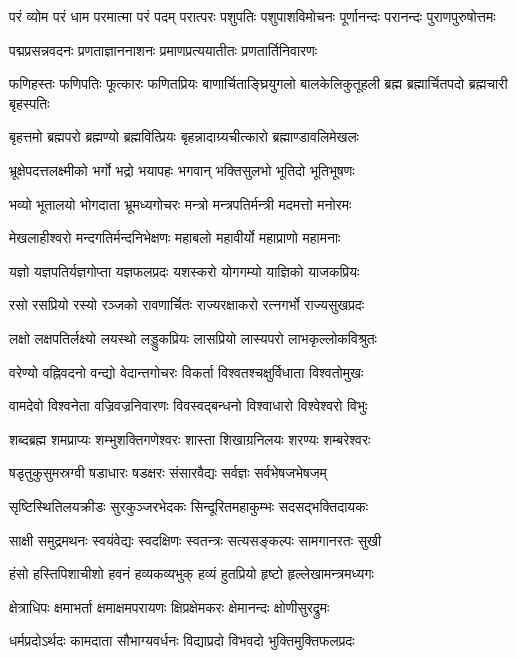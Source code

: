 \threelineshloka
{परं व्योम परं धाम परमात्मा परं पदम्}
{परात्परः पशुपतिः पशुपाशविमोचनः}
{पूर्णानन्दः परानन्दः पुराणपुरुषोत्तमः}

\twolineshloka
{पद्मप्रसन्नवदनः प्रणताज्ञाननाशनः}
{प्रमाणप्रत्ययातीतः प्रणतार्तिनिवारणः}

\threelineshloka
{फणिहस्तः फणिपतिः फूत्कारः फणितप्रियः}
{बाणार्चिताङ्घ्रियुगलो बालकेलिकुतूहली}
{ब्रह्म ब्रह्मार्चितपदो ब्रह्मचारी बृहस्पतिः}

\twolineshloka
{बृहत्तमो ब्रह्मपरो ब्रह्मण्यो ब्रह्मवित्प्रियः}
{बृहन्नादाग्र्यचीत्कारो ब्रह्माण्डावलिमेखलः}

\twolineshloka
{भ्रूक्षेपदत्तलक्ष्मीको भर्गो भद्रो भयापहः}
{भगवान् भक्तिसुलभो भूतिदो भूतिभूषणः}

\twolineshloka
{भव्यो भूतालयो भोगदाता भ्रूमध्यगोचरः}
{मन्त्रो मन्त्रपतिर्मन्त्री मदमत्तो मनोरमः}

\twolineshloka
{मेखलाहीश्वरो मन्दगतिर्मन्दनिभेक्षणः}
{महाबलो महावीर्यो महाप्राणो महामनाः}

\twolineshloka
{यज्ञो यज्ञपतिर्यज्ञगोप्ता यज्ञफलप्रदः}
{यशस्करो योगगम्यो याज्ञिको याजकप्रियः}

\twolineshloka
{रसो रसप्रियो रस्यो रञ्जको रावणार्चितः}
{राज्यरक्षाकरो रत्नगर्भो राज्यसुखप्रदः}

\twolineshloka
{लक्षो लक्षपतिर्लक्ष्यो लयस्थो लड्डुकप्रियः}
{लासप्रियो लास्यपरो लाभकृल्लोकविश्रुतः}

\twolineshloka
{वरेण्यो वह्निवदनो वन्द्यो वेदान्तगोचरः}
{विकर्ता विश्वतश्चक्षुर्विधाता विश्वतोमुखः}

\twolineshloka
{वामदेवो विश्वनेता वज्रिवज्रनिवारणः}
{विवस्वद्बन्धनो विश्वाधारो विश्वेश्वरो विभुः}

\twolineshloka
{शब्दब्रह्म शमप्राप्यः शम्भुशक्तिगणेश्वरः}
{शास्ता शिखाग्रनिलयः शरण्यः शम्बरेश्वरः}

\twolineshloka
{षडृतुकुसुमस्रग्वी षडाधारः षडक्षरः}
{संसारवैद्यः सर्वज्ञः सर्वभेषजभेषजम्}

\twolineshloka
{सृष्टिस्थितिलयक्रीडः सुरकुञ्जरभेदकः}
{सिन्दूरितमहाकुम्भः सदसद्भक्तिदायकः}

\twolineshloka
{साक्षी समुद्रमथनः स्वयंवेद्यः स्वदक्षिणः}
{स्वतन्त्रः सत्यसङ्कल्पः सामगानरतः सुखी}

\twolineshloka
{हंसो हस्तिपिशाचीशो हवनं हव्यकव्यभुक्}
{हव्यं हुतप्रियो हृष्टो हृल्लेखामन्त्रमध्यगः}

\twolineshloka
{क्षेत्राधिपः क्षमाभर्ता क्षमाक्षमपरायणः}
{क्षिप्रक्षेमकरः क्षेमानन्दः क्षोणीसुरद्रुमः}

\twolineshloka
{धर्मप्रदोऽर्थदः कामदाता सौभाग्यवर्धनः}
{विद्याप्रदो विभवदो भुक्तिमुक्तिफलप्रदः}

